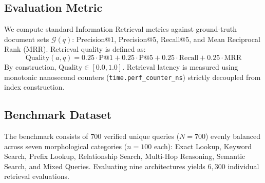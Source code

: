 \documentclass[10pt,twocolumn,letterpaper]{article}
\begin{document}
\subsection{Evaluation Metric}
We compute standard Information Retrieval metrics against ground-truth document sets $\mathcal{G}(q)$: Precision@1, Precision@5, Recall@5, and Mean Reciprocal Rank (MRR). Retrieval quality is defined as:
\begin{equation}
    \text{Quality}(a, q) = 0.25 \cdot \text{P@1} + 0.25 \cdot \text{P@5} + 0.25 \cdot \text{Recall} + 0.25 \cdot \text{MRR}
\end{equation}
By construction, $\text{Quality} \in [0.0, 1.0]$. Retrieval latency is measured using monotonic nanosecond counters (\texttt{time.perf\_counter\_ns}) strictly decoupled from index construction.

\subsection{Benchmark Dataset}
The benchmark consists of 700 verified unique queries ($N=700$) evenly balanced across seven morphological categories ($n=100$ each): Exact Lookup, Keyword Search, Prefix Lookup, Relationship Search, Multi-Hop Reasoning, Semantic Search, and Mixed Queries. Evaluating nine architectures yields $6{,}300$ individual retrieval evaluations.
\end{document}
